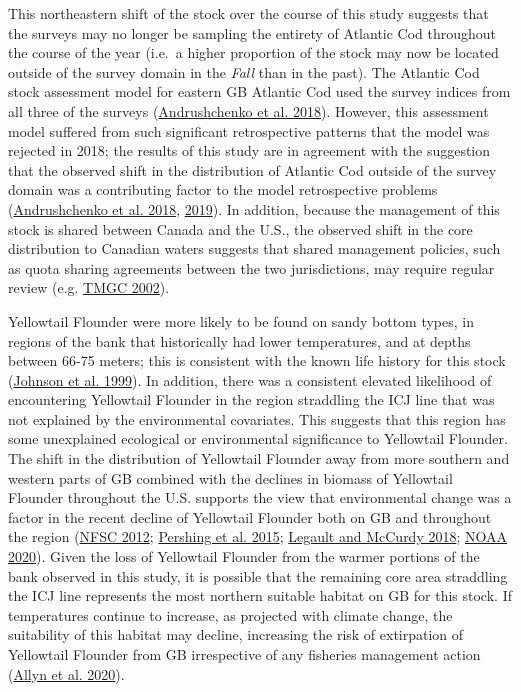 \documentclass[
]{article}
\begin{document}
This northeastern shift of the stock over the course of this study suggests that the surveys may no longer be sampling the entirety of Atlantic Cod throughout the course of the year (i.e.~a higher proportion of the stock may now be located outside of the survey domain in the \emph{Fall} than in the past). The Atlantic Cod stock assessment model for eastern GB Atlantic Cod used the survey indices from all three of the surveys (\protect\hyperlink{ref-andrushchenkoAssessmentEasternGeorges2018}{Andrushchenko et al. 2018}). However, this assessment model suffered from such significant retrospective patterns that the model was rejected in 2018; the results of this study are in agreement with the suggestion that the observed shift in the distribution of Atlantic Cod outside of the survey domain was a contributing factor to the model retrospective problems (\protect\hyperlink{ref-andrushchenkoAssessmentEasternGeorges2018}{Andrushchenko et al. 2018}, \protect\hyperlink{ref-andrushchenkoAlternativeMethodologiesProviding2019}{2019}). In addition, because the management of this stock is shared between Canada and the U.S., the observed shift in the core distribution to Canadian waters suggests that shared management policies, such as quota sharing agreements between the two jurisdictions, may require regular review (e.g. \protect\hyperlink{ref-tmgcDevelopmentSharingAllocation2002}{TMGC 2002}).

Yellowtail Flounder were more likely to be found on sandy bottom types, in regions of the bank that historically had lower temperatures, and at depths between 66-75 meters; this is consistent with the known life history for this stock (\protect\hyperlink{ref-johnsonYellowtailFlounderLimanda1999}{Johnson et al. 1999}). In addition, there was a consistent elevated likelihood of encountering Yellowtail Flounder in the region straddling the ICJ line that was not explained by the environmental covariates. This suggests that this region has some unexplained ecological or environmental significance to Yellowtail Flounder. The shift in the distribution of Yellowtail Flounder away from more southern and western parts of GB combined with the declines in biomass of Yellowtail Flounder throughout the U.S. supports the view that environmental change was a factor in the recent decline of Yellowtail Flounder both on GB and throughout the region (\protect\hyperlink{ref-nfsc54thNortheastRegional2012}{NFSC 2012}; \protect\hyperlink{ref-pershingSlowAdaptationFace2015}{Pershing et al. 2015}; \protect\hyperlink{ref-legaultStockAssessmentGeorges2018}{Legault and McCurdy 2018}; \protect\hyperlink{ref-noaaNOAAYellowtailFlounder2020}{NOAA 2020}). Given the loss of Yellowtail Flounder from the warmer portions of the bank observed in this study, it is possible that the remaining core area straddling the ICJ line represents the most northern suitable habitat on GB for this stock. If temperatures continue to increase, as projected with climate change, the suitability of this habitat may decline, increasing the risk of extirpation of Yellowtail Flounder from GB irrespective of any fisheries management action (\protect\hyperlink{ref-allynComparingSynthesizingQuantitative2020}{Allyn et al. 2020}).
\end{document}
